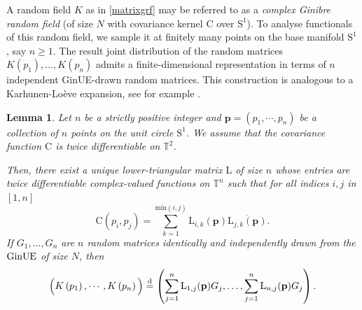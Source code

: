 \documentclass[pdflatex,sn-mathphys-num]{sn-jnl}
\theoremstyle{thmstyleone}
\newtheorem{lemma}[theorem]{Lemma}
\numberwithin{equation}{section}
\newcommand{\Sp}{\mathrm{S}^{1}}
\newcommand{\Cc}{\mathrm{C}}
\begin{document}
A random field $K$ as in \eqref{matrixgrf} may be referred to as a \textit{complex Ginibre random field} (of size $N$ with covariance kernel $\Cc$ over $\Sp$). To analyse functionals of this random field, we sample it at finitely many points on the base manifold $\Sp$, say $n\geq 1$. The result joint distribution of the random matrices $K(p_{1}),\ldots,K(p_{n})$ admits a finite-dimensional representation in terms of $n$ independent GinUE-drawn random matrices. This construction is analogous to a Karhunen-Lo\`eve expansion, see for example \cite[Sec.~3.2]{taylorRandomFieldsGeometry2007}.
\begin{lemma}\label{technicallemma1}
    Let $n$ be a strictly positive integer and $\mathbf{p}=\left(p_{1},\cdots,p_{n}\right)$ be a collection of $n$ points on the unit circle $\Sp$. We assume that the covariance function $\Cc$ is twice differentiable on $\mathbb{T}^{2}$.
    
    Then, there exist a unique lower-triangular matrix $\mathrm{L}$ of size $n$  whose entries are twice differentiable complex-valued functions on $\mathbb{T}^{n}$ such that for all indices $i,j$ in $[1,n]$
    \begin{equation}
        \Cc(p_{i},p_{j})=\sum_{k=1}^{\mathrm{min}(i,j)}\mathrm{L}_{i,k}(\mathbf{p})\overline{\mathrm{L}_{j,k}(\mathbf{p})}.
    \end{equation}
    If $G_{1},\ldots,G_{n}$ are $n$ random matrices identically and independently drawn from the ${\rm GinUE}$ of size $N$, then
    \begin{equation}\label{K.Gauss}
        \Big( K\left( p_{1} \right),\cdots,K\left( p_{n} \right) \Big)\overset{\rm d}{=}\left(\sum\limits_{j=1}^{n}\mathrm{L}_{1,j}(\mathbf{p})G_{j},\ldots,\sum\limits_{j=1}^{n}\mathrm{L}_{n,j}(\mathbf{p})G_{j}\right).
    \end{equation}
\end{lemma}
\end{document}

